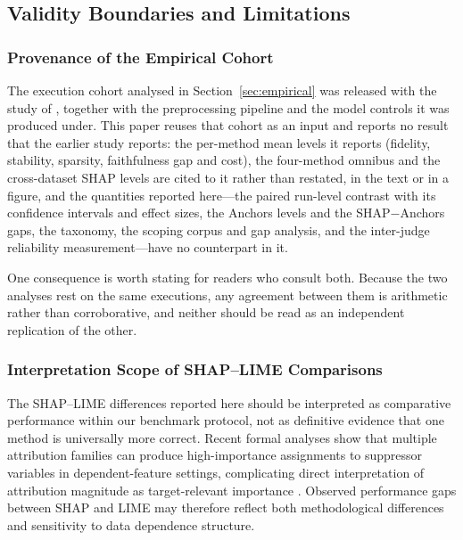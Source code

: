 \documentclass[fleqn,10pt,lineno]{wlpeerj}
\begin{document}
\subsection{Validity Boundaries and Limitations}
\label{sec:validity}

\subsubsection{Provenance of the Empirical Cohort}
\label{sec:prior_publication}

The execution cohort analysed in Section~\ref{sec:empirical} was released
with the study of \citet{herrera2026framework}, together with the
preprocessing pipeline and the model controls it was produced under. This
paper reuses that cohort as an input and reports no result that the earlier
study reports: the per-method mean levels it reports (fidelity, stability,
sparsity, faithfulness gap and cost), the four-method omnibus and the
cross-dataset SHAP levels are cited to it rather than restated, in the text
or in a figure, and the quantities reported here---the paired run-level contrast
with its confidence intervals and effect sizes, the Anchors levels and the
SHAP$-$Anchors gaps, the taxonomy, the scoping corpus and gap analysis, and
the inter-judge reliability measurement---have no counterpart in it.

One consequence is worth stating for readers who consult both. Because the
two analyses rest on the same executions, any agreement between them is
arithmetic rather than corroborative, and neither should be read as an
independent replication of the other.

\subsubsection{Interpretation Scope of SHAP--LIME Comparisons}
\label{sec:interpretation_scope}

The SHAP--LIME differences reported here should be interpreted as
comparative performance within our benchmark protocol, not as definitive
evidence that one method is universally more correct. Recent formal
analyses show that multiple attribution families can produce
high-importance assignments to suppressor variables in
dependent-feature settings, complicating direct interpretation of
attribution magnitude as target-relevant importance
\citep{wilming2022scrutinizing,wilming2023theoretical,haufe2026formalization}.
Observed performance gaps between SHAP and LIME may therefore reflect both
methodological differences and sensitivity to data dependence structure.
\end{document}
